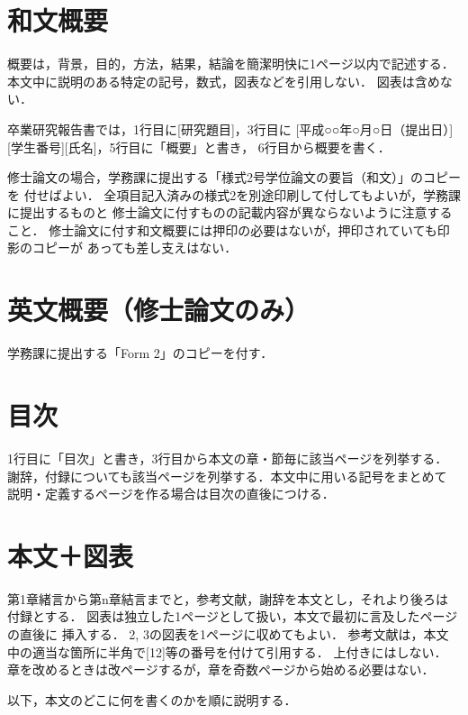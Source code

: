 \documentclass[main]{subfiles}
\begin{document}
\section{和文概要}
概要は，背景，目的，方法，結果，結論を簡潔明快に1ページ以内で記述する．
本文中に説明のある特定の記号，数式，図表などを引用しない．
図表は含めない．


卒業研究報告書では，1行目に[研究題目]，3行目に
[平成○○年○月○日（提出日）][学生番号][氏名]，5行目に「概要」と書き，
6行目から概要を書く．


修士論文の場合，学務課に提出する「様式2号学位論文の要旨（和文）」のコピーを
付せばよい．
全項目記入済みの様式2を別途印刷して付してもよいが，学務課に提出するものと
修士論文に付すものの記載内容が異ならないように注意すること．
修士論文に付す和文概要には押印の必要はないが，押印されていても印影のコピーが
あっても差し支えはない．

\section{英文概要（修士論文のみ）}
学務課に提出する「Form 2」のコピーを付す．

\section{目次}
1行目に「目次」と書き，3行目から本文の章・節毎に該当ページを列挙する．
謝辞，付録についても該当ページを列挙する．本文中に用いる記号をまとめて
説明・定義するページを作る場合は目次の直後につける．

\section{本文＋図表}
第1章緒言から第n章結言までと，参考文献，謝辞を本文とし，それより後ろは
付録とする．
図表は独立した1ページとして扱い，本文で最初に言及したページの直後に
挿入する．
2, 3の図表を1ページに収めてもよい．
参考文献は，本文中の適当な箇所に半角で[12]等の番号を付けて引用する．
上付きにはしない．
章を改めるときは改ページするが，章を奇数ページから始める必要はない．

以下，本文のどこに何を書くのかを順に説明する．
\end{document}
